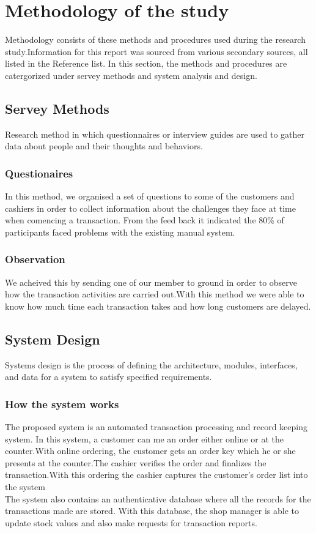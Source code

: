 \documentclass[12pt]{article}
\begin{document}
\section{Methodology of the study}
Methodology consists of these methods and procedures used during the research study.Information for this report was sourced from various secondary sources, all listed in the Reference list. In this section, the methods and procedures are catergorized under servey methods and system analysis and design.
\subsection{Servey Methods}
Research method in which questionnaires or interview guides are used to gather data about people and their thoughts and behaviors.
\subsubsection{Questionaires}
In this method, we organised a set of questions to some of the customers and cashiers in order to collect information about the challenges they face at time when comencing a transaction. From the feed back it indicated the 80\% of participants faced problems with the existing manual system.
\subsubsection{Observation}
We acheived this by sending one of our member to ground in order to observe how the transaction activities are carried out.With this method we were able to know how much time each transaction takes and how long customers are delayed.
\subsection{System Design}
Systems design is the process of defining the architecture, modules, interfaces, and data for a system to satisfy specified requirements.
\subsubsection{How the system works}
The proposed system is an automated transaction processing and record keeping system. In this system, a customer can me an order either online or at the counter.With online ordering, the customer gets an order key which he or she presents at the counter.The cashier verifies the order and finalizes the transaction.With this ordering the cashier captures the customer's order list into the system\\
The system also contains an authenticative database where all the records for the transactions made are stored. With this database, the shop manager is able to update stock values and also make requests for transaction reports.
\end{document}
